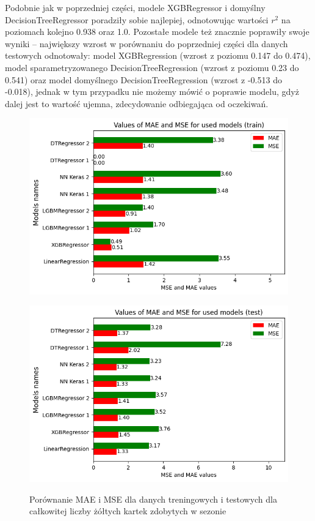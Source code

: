 \documentclass{article}
\begin{document}
Podobnie jak w poprzedniej części, modele XGBRegressor i domyślny DecisionTreeRegressor poradziły sobie najlepiej, odnotowując wartości $r^2$ na poziomach kolejno 0.938 oraz 1.0. Pozostałe modele też znacznie poprawiły swoje wyniki – największy wzrost w porównaniu do poprzedniej części dla danych testowych odnotowały: model XGBRegression (wzrost z poziomu 0.147 do 0.474), model sparametryzowanego DecisionTreeRegression (wzrost z poziomu 0.23 do 0.541) oraz model domyślnego DecisionTreeRegression (wzrost z -0.513 do -0.018), jednak w tym przypadku nie możemy mówić o poprawie modelu, gdyż dalej jest to wartość ujemna, zdecydowanie odbiegająca od oczekiwań. 


\begin{figure}[H]
  \centering
  \begin{minipage}[b]{0.5\textwidth}
    \centering
    \includegraphics[width=\textwidth]{all_errors_5.png}
    \label{fig:all_errors_5}
  \end{minipage}%
  \begin{minipage}[b]{0.5\textwidth}
    \centering
    \includegraphics[width=\textwidth]{all_errors_6.png}
    \label{fig:all_errors_6}
  \end{minipage}
  \captionsetup{justification=centering}
  \caption{Porównanie MAE i MSE dla danych treningowych i testowych dla całkowitej liczby żółtych kartek zdobytych w sezonie}
  \label{fig:all_errors_2_1}
\end{figure}
\end{document}
